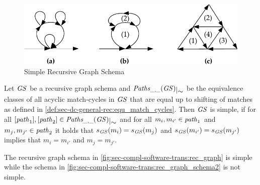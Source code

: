 \begin{figure}[!tb]
\begin{center}
\includegraphics[width=.75\textwidth]{img/software_trans/simple.pdf}
\end{center}
\caption{Simple Recursive Graph Schema}
\label{fig:sec-dc-general-rec:simple_rec_schema}
\end{figure}

\begin{definition}
\label{def:sec-dc-general-rec:simple_rec_gr_schema}
Let $\mathit{GS}$ be a recursive graph schema and $\quotient{\Paths_{\_,\_}(\GS)}{\sim}$ be the equivalence classes of all acyclic match-cycles in $\mathit{GS}$ that are equal up to shifting of matches as defined in \cref{def:sec-dc-general-rec:equ_match_cycles}.
Then $\mathit{GS}$ is simple, if for all $[\paths_1],[\paths_2] \in \quotient{\Paths_{\_,\_}(\GS)}{\sim}$ and for all $m_i,m_{i'} \in \mathit{path}_1$ and $m_j,m_{j'} \in \mathit{path}_2$ it holds that $s_\mathit{GS}(m_i)=s_\mathit{GS}(m_j)$ and $s_\mathit{GS}(m_{i'})=s_\mathit{GS}(m_{j'})$ implies that $m_i=m_{i'}$ and $m_j=m_{j'}$.
\envEndMarker
\end{definition}

\begin{example}
The recursive graph schema in \cref{fig:sec-compl-software-trans:rec_graph} is simple while the schema in \cref{fig:sec-compl-software-trans:rec_graph_schema2} is not simple.
\envEndMarker
\end{example}

